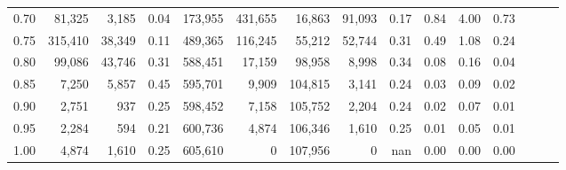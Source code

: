 \begin{tabular}{rrrrrrrrrrrrrrr}
0.70 &   81,325 &   3,185 &  0.04 &  173,955 &  431,655 &   16,863 &   91,093 &  0.17 &  0.84 &  4.00 &      0.73 \\
0.75 &  315,410 &  38,349 &  0.11 &  489,365 &  116,245 &   55,212 &   52,744 &  0.31 &  0.49 &  1.08 &      0.24 \\
0.80 &   99,086 &  43,746 &  0.31 &  588,451 &   17,159 &   98,958 &    8,998 &  0.34 &  0.08 &  0.16 &      0.04 \\
0.85 &    7,250 &   5,857 &  0.45 &  595,701 &    9,909 &  104,815 &    3,141 &  0.24 &  0.03 &  0.09 &      0.02 \\
0.90 &    2,751 &     937 &  0.25 &  598,452 &    7,158 &  105,752 &    2,204 &  0.24 &  0.02 &  0.07 &      0.01 \\
0.95 &    2,284 &     594 &  0.21 &  600,736 &    4,874 &  106,346 &    1,610 &  0.25 &  0.01 &  0.05 &      0.01 \\
1.00 &    4,874 &   1,610 &  0.25 &  605,610 &        0 &  107,956 &        0 &   nan &  0.00 &  0.00 &      0.00 \\
\bottomrule
\end{tabular}
